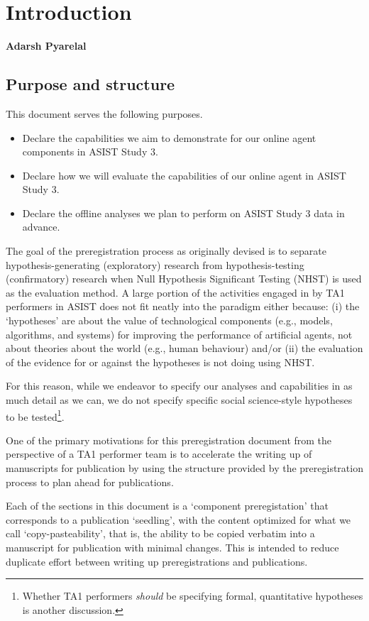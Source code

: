 \chapter{Introduction}
\textbf{Adarsh Pyarelal}

\section{Purpose and structure}

This document serves the following purposes.

\begin{itemize}
    \item Declare the capabilities we aim to demonstrate for our online agent
        components in ASIST Study 3.
    \item Declare how we will evaluate the capabilities of our online agent in
        ASIST Study 3.
    \item Declare the offline analyses we plan to perform on ASIST Study 3 data
        in advance.
\end{itemize}


The goal of the preregistration process as originally devised
\citep{Nosek.ea:2018} is to separate hypothesis-generating (exploratory)
research from hypothesis-testing (confirmatory) research when Null Hypothesis
Significant Testing (NHST) is used as the evaluation method. A large portion of
the activities engaged in by TA1 performers in ASIST does not fit neatly into
the paradigm either because: (i) the `hypotheses' are about the value of
technological components (e.g., models, algorithms, and systems) for improving
the performance of artificial agents, not about theories about the world (e.g.,
human behaviour) and/or (ii) the evaluation of the evidence for or against the
hypotheses is not doing using NHST.

For this reason, while we endeavor to specify our analyses and capabilities in
as much detail as we can, we do not specify specific social science-style
hypotheses to be tested\footnote{Whether TA1 performers \emph{should} be
    specifying formal, quantitative hypotheses is another discussion.}.

One of the primary motivations for this preregistration document from the
perspective of a TA1 performer team is to accelerate the writing up of
manuscripts for publication by using the structure provided by the
preregistration process to plan ahead for publications.

Each of the sections in this document is a `component preregistation' that
corresponds to a publication `seedling', with the content optimized for what we
call `copy-pasteability', that is, the ability to be copied verbatim into a
manuscript for publication with minimal changes. This is intended to reduce
duplicate effort between writing up preregistrations and publications.


